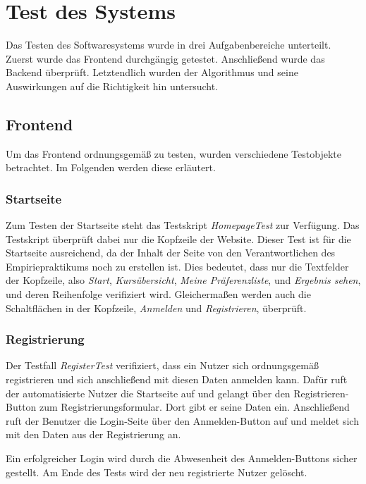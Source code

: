 \chapter{Test des Systems}
\label{chapter:testing}

	Das Testen des Softwaresystems wurde in drei Aufgabenbereiche unterteilt.
	Zuerst wurde das Frontend durchgängig getestet.
	Anschließend wurde das Backend überprüft.
	Letztendlich wurden der Algorithmus und seine Auswirkungen auf die Richtigkeit hin untersucht.\newline
	
	\section{Frontend}
		Um das Frontend ordnungsgemäß zu testen, wurden verschiedene Testobjekte betrachtet.
		Im Folgenden werden diese erläutert.
		
		\subsection{Startseite}
			Zum Testen der Startseite steht das Testskript \textit{HomepageTest} zur Verfügung.
			Das Testskript überprüft dabei nur die Kopfzeile der Website.
            Dieser Test ist für die Startseite ausreichend, da der Inhalt der Seite von den Verantwortlichen des Empiriepraktikums noch zu erstellen ist.
			Dies bedeutet, dass nur die Textfelder der Kopfzeile, also \textit{Start}, \textit{Kursübersicht}, \textit{Meine Präferenzliste}, und \textit{Ergebnis sehen}, und deren Reihenfolge verifiziert wird.
			Gleichermaßen werden auch die Schaltflächen in der Kopfzeile, \textit{Anmelden} und \textit{Registrieren}, überprüft.
		
		\subsection{Registrierung}
			Der Testfall \textit{RegisterTest} verifiziert, dass ein Nutzer sich ordnungsgemäß registrieren und sich anschließend mit diesen Daten anmelden kann.
			Dafür ruft der automatisierte Nutzer die Startseite auf und gelangt über den \glqq Registrieren\grqq -Button zum Registrierungsformular.
			Dort gibt er seine Daten ein.
			Anschließend ruft der Benutzer die Login-Seite über den \glqq Anmelden\grqq -Button auf und meldet sich mit den Daten aus der Registrierung an.
            
			Ein erfolgreicher Login wird durch die Abwesenheit des \glqq Anmelden\grqq -Buttons sicher gestellt.
			Am Ende des Tests wird der neu registrierte Nutzer gelöscht.
		
